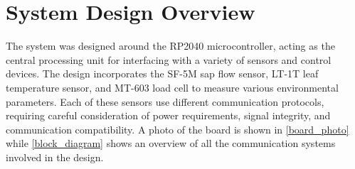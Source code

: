 
\section{System Design Overview}

The system was designed around the RP2040 microcontroller, acting as the central 
processing unit for interfacing with a variety of sensors and control devices. 
The design incorporates the SF-5M sap flow sensor, LT-1T leaf temperature sensor, 
and MT-603 load cell to measure various environmental parameters. Each of these 
sensors use different communication protocols, requiring careful consideration of 
power requirements, signal integrity, and communication compatibility. A photo 
of the board is shown in \cref{board_photo} while \cref{block_diagram} 
shows an overview of all the communication systems involved in the design.

